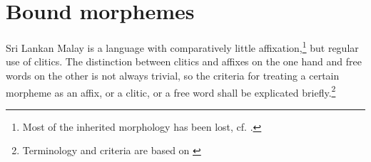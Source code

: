 \chapter{Bound morphemes}\label{sec:form:Clitics}
Sri Lankan Malay is a language with comparatively little affixation,\footnote{Most of the inherited morphology has been lost, cf. \citet{Adelaar1991}.} but regular use of clitics. The distinction between clitics and affixes on the one hand and free words on the other  is not always trivial, so the criteria for treating a certain morpheme as an affix, or a clitic, or a free word shall be explicated briefly.\footnote{Terminology and criteria are based on \citet{Zwicky1977, ZwickyEtAl1983}}

%
%
%
